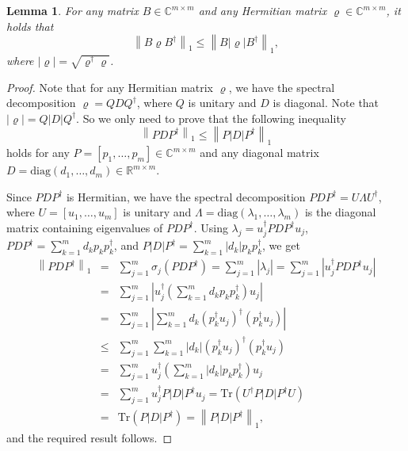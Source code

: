\documentclass[preprint,3p,compress,12pt]{elsarticle}
\numberwithin{equation}{section}
\newtheorem{lemma}[theorem]{Lemma}
\numberwithin{figure}{section}
\begin{document}
\begin{lemma}\label{lem4.2}
  For any matrix $B\in \mathbb{C}^{m\times m}$ and any Hermitian matrix $\varrho\in \mathbb{C}^{m\times m}$, it holds that
  \[\left\|B\varrho B^{\dag}\right\|_1\leq \left\|B|\varrho|B^{\dag}\right\|_1,\]
  where $|\varrho|=\sqrt{\varrho^{\dag}\varrho}$.
\end{lemma}
\begin{proof}
  Note that for any Hermitian matrix $\varrho$, we have the spectral decomposition $\varrho=QD Q^{\dag}$, where $Q$ is unitary and $D$ is diagonal. Note that $|\varrho|=Q|D|Q^{\dag}$. So we only need to prove that the following inequality
  \[\left\|PDP^{\dag}\right\|_1\leq \left\|P|D|P^{\dag}\right\|_1\]
  holds for any $P=[p_1,\ldots,p_m]\in \mathbb{C}^{m\times m}$ and any diagonal matrix $D=\mbox{diag}(d_1,\ldots,d_m)\in \mathbb{R}^{m\times m}$.

  Since $PDP^{\dag}$ is Hermitian, we have the spectral decomposition $PDP^{\dag}=U\Lambda U^{\dag}$, where $U=[u_1,\ldots,u_m]$ is unitary and $\Lambda=\mbox{diag}(\lambda_1,\ldots,\lambda_m)$ is the diagonal matrix containing eigenvalues of $PDP^{\dag}$. Using $\lambda_j=u_j^{\dag}PDP^{\dag}u_j$, $PDP^{\dag}=\sum\limits_{k=1}^md_kp_kp_k^{\dag}$, and $P|D|P^{\dag}=\sum\limits_{k=1}^m|d_k|p_kp_k^{\dag}$, we get
  \begin{eqnarray*}
    \left\|PDP^{\dag}\right\|_1&=&\sum_{j=1}^m\sigma_j(PDP^{\dag})=\sum_{j=1}^m|\lambda_j|=\sum_{j=1}^m\left|u_j^{\dag}PDP^{\dag}u_j\right|\\
    &=&\sum_{j=1}^m\left|u_j^{\dag}\left(\sum_{k=1}^md_kp_kp_k^{\dag}\right)u_j\right|\\
    &=&\sum_{j=1}^m\left|\sum_{k=1}^md_k (p_k^{\dag}u_j)^{\dag}(p_k^{\dag}u_j)\right|\\
    &\leq&\sum_{j=1}^m\sum_{k=1}^m|d_k| (p_k^{\dag}u_j)^{\dag}(p_k^{\dag}u_j)\\
    &=&\sum_{j=1}^mu_j^{\dag}\left(\sum_{k=1}^m|d_k|p_kp_k^{\dag}\right)u_j\\
    &=&\sum_{j=1}^mu_j^{\dag}P|D|P^{\dag}u_j=\mbox{Tr}(U^{\dag}P|D|P^{\dag}U)\\
    &=&\mbox{Tr}(P|D|P^{\dag})=\left\|P|D|P^{\dag}\right\|_1,
  \end{eqnarray*}
  and the required result follows.
\end{proof}
\end{document}
